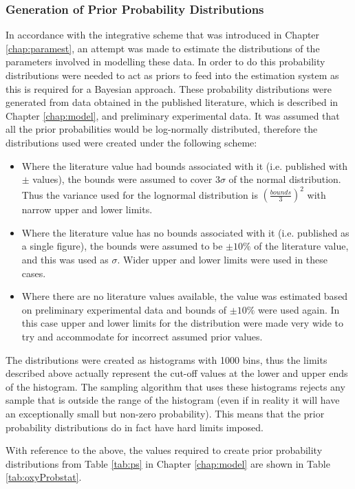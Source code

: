 \subsubsection{Generation of Prior Probability Distributions}
In accordance with the integrative scheme that was introduced in Chapter \ref{chap:paramest}, an attempt was made to estimate the distributions of the parameters involved in modelling these data. In order to do this probability distributions were needed to act as priors to feed into the estimation system as this is required for a Bayesian approach. These probability distributions were generated from data obtained in the published literature, which is described in Chapter \ref{chap:model}, and preliminary experimental data. It was assumed that all the prior probabilities would be log-normally distributed, therefore the distributions  used were created under the following scheme:
\begin{itemize}
\item Where the literature value had bounds associated with it (i.e. published with $\pm{}$ values), the bounds were assumed to cover $3 \sigma$ of the normal distribution. Thus the variance used for the lognormal distribution is $\left(\frac{bounds}{3}\right)^2$ with narrow upper and lower limits.
\item Where the literature value has no bounds associated with it (i.e. published as a single figure), the bounds were assumed to be $\pm 10\%$ of the literature value, and this was used as $\sigma$. Wider upper and lower limits were used in these cases.
\item Where there are no literature values available, the value was estimated based on preliminary experimental data and bounds of $\pm 10\%$ were used again. In this case upper and lower limits for the distribution were made very wide to try and accommodate for incorrect assumed prior values.
\end{itemize}

\noindent The distributions were created as histograms with 1000 bins, thus the limits described above actually represent the cut-off values at the lower and upper ends of the histogram. The sampling algorithm that uses these histograms rejects any sample that is outside the range of the histogram (even if in reality it will have an exceptionally small but non-zero probability). This means that the prior probability distributions do in fact have hard limits imposed.

With reference to the above, the values required to create prior probability distributions from Table \ref{tab:ps} in Chapter \ref{chap:model} are shown in Table \ref{tab:oxyProbstat}.

